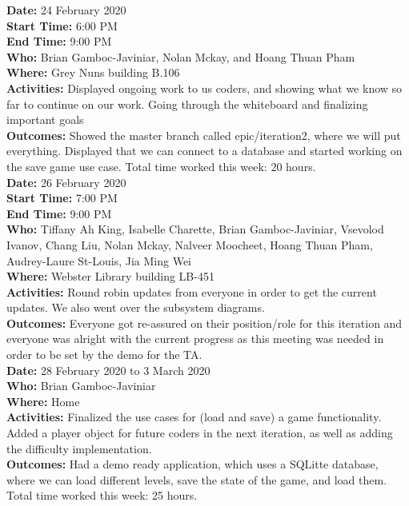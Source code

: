 \documentclass[12pt]{article}
\begin{document}
{\bf Date:} 24 February 2020 \\
{\bf Start Time:} 6:00 PM\\
{\bf End Time:} 9:00 PM \\
{\bf Who:} Brian Gamboc-Javiniar, Nolan Mckay, and Hoang Thuan Pham \\
{\bf Where:} Grey Nuns building B.106 \\
{\bf Activities:} Displayed ongoing work to us coders, and showing what we know so far to continue on our work. Going through the whiteboard and finalizing important goals \\
{\bf Outcomes:} Showed the master branch called epic/iteration2, where we will put everything. Displayed that we can connect to a database and started working on the save game use case. Total time worked this week: 20 hours.\\

{\bf Date:} 26 February 2020 \\
{\bf Start Time:} 7:00 PM\\
{\bf End Time:} 9:00 PM \\
{\bf Who:} Tiffany Ah King, Isabelle Charette, Brian Gamboc-Javiniar, Vsevolod Ivanov, Chang Liu, Nolan Mckay, Nalveer Moocheet, Hoang Thuan Pham, Audrey-Laure St-Louis, Jia Ming Wei\\
{\bf Where:} Webster Library building LB-451 \\
{\bf Activities:} Round robin updates from everyone in order to get the current updates. We also went over the subsystem diagrams. \\
{\bf Outcomes:} Everyone got re-assured on their position/role for this iteration and everyone was alright with the current progress as this meeting was needed in order to be set by the demo for the TA. \\

{\bf Date:} 28 February 2020 to 3 March 2020 \\
{\bf Who:} Brian Gamboc-Javiniar \\
{\bf Where:} Home \\
{\bf Activities:} Finalized the use cases for (load and save) a game functionality. Added a player object for future coders in the next iteration, as well as adding the difficulty implementation. \\
{\bf Outcomes:} Had a demo ready application, which uses a SQLitte database, where we can load different levels, save the state of the game, and load them. Total time worked this week: 25 hours. \\
\end{document}
